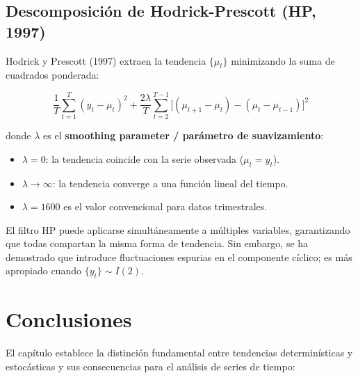 \documentclass[12pt]{article}
\begin{document}
\subsection{Descomposici\'on de Hodrick-Prescott (HP, 1997)}

Hodrick y Prescott (1997) extraen la tendencia $\{\mu_t\}$ minimizando
la suma de cuadrados ponderada:

\begin{equation}
  \frac{1}{T}\sum_{t=1}^{T}(y_t-\mu_t)^2
  +\frac{2\lambda}{T}\sum_{t=2}^{T-1}
   \bigl[(\mu_{t+1}-\mu_t)-(\mu_t-\mu_{t-1})\bigr]^2
\end{equation}

donde $\lambda$ es el \textbf{smoothing parameter / par\'ametro de
suavizamiento}:

\begin{itemize}
  \item $\lambda = 0$: la tendencia coincide con la serie observada
        ($\mu_t = y_t$).
  \item $\lambda \to \infty$: la tendencia converge a una funci\'on lineal
        del tiempo.
  \item $\lambda = 1600$ es el valor convencional para datos trimestrales.
\end{itemize}

El filtro HP puede aplicarse simult\'aneamente a m\'ultiples variables,
garantizando que todas compartan la misma forma de tendencia. Sin embargo,
se ha demostrado que introduce fluctuaciones espurias en el componente
c\'iclico; es m\'as apropiado cuando $\{y_t\} \sim I(2)$.

\section{Conclusiones}

El cap\'itulo establece la distinci\'on fundamental entre tendencias
determin\'isticas y estoc\'asticas y sus consecuencias para el an\'alisis
de series de tiempo:
\end{document}
